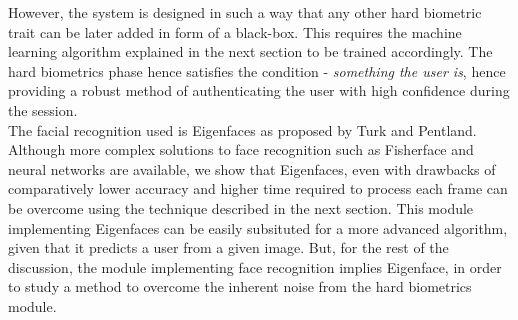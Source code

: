 \documentclass[%
        final,
        notitlepage,
        narroweqnarray,
        inline,
        ]{ieee}
\begin{document}
However, the system is designed in such a way that any other hard biometric trait can be later added in form of a black-box. This requires the machine learning algorithm explained in the next section to be trained accordingly.
The hard biometrics phase hence satisfies the condition - \emph{something the user is}, hence providing a robust method of authenticating the user with high confidence during the session.\\
The facial recognition used is Eigenfaces\cite{Turk91} as proposed by Turk and Pentland.
Although more complex solutions to face recognition such as Fisherface and neural networks are available, we show that Eigenfaces, even with drawbacks of comparatively lower accuracy and higher time required to process each frame can be overcome using the technique described in the next section.
This module implementing Eigenfaces can be easily subsituted for a more advanced algorithm, given that it predicts a user from a given image.
But, for the rest of the discussion, the module implementing face recognition implies Eigenface, in order to study a method to overcome the inherent noise from the hard biometrics module.
\end{document}
